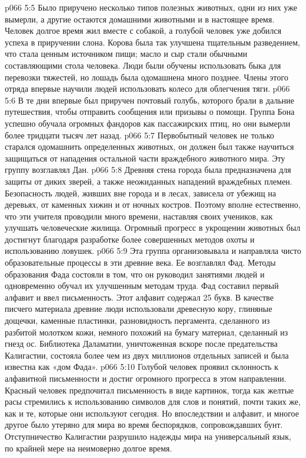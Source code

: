 \vs p066 5:5 Было приручено несколько типов полезных животных, одни из них уже вымерли, а другие остаются домашними животными и в настоящее время. Человек долгое время жил вместе с собакой, а голубой человек уже добился успеха в приручении слона. Корова была так улучшена тщательным разведением, что стала ценным источником пищи; масло и сыр стали обычными составляющими стола человека. Люди были обучены использовать быка для перевозки тяжестей, но лошадь была одомашнена много позднее. Члены этого отряда впервые научили людей использовать колесо для облегчения тяги.
\vs p066 5:6 В те дни впервые был приручен почтовый голубь, которого брали в дальние путешествия, чтобы отправить сообщения или призывы о помощи. Группа Бона успешно обучала огромных фандоров как пассажирских птиц, но они вымерли более тридцати тысяч лет назад.
\vs p066 5:7 \pc {}\bibnobreakspace {} Первобытный человек не только старался одомашнить определенных животных, он должен был также научиться защищаться от нападения остальной части враждебного животного мира. Эту группу возглавлял Дан.
\vs p066 5:8 Древняя стена города была предназначена для защиты от диких зверей, а также неожиданных нападений враждебных племен. Безопасность людей, живших вне города и в лесах, зависела от убежищ на деревьях, от каменных хижин и от ночных костров. Поэтому вполне естественно, что эти учителя проводили много времени, наставляя своих учеников, как улучшать человеческие жилища. Огромный прогресс в укрощении животных был достигнут благодаря разработке более совершенных методов охоты и использованию ловушек.
\vs p066 5:9 \pc {}\bibnobreakspace {} Эта группа организовывала и направляла чисто образовательные процессы в эти древние века. Ее возглавлял Фад. Методы образования Фада состояли в том, что он руководил занятиями людей и одновременно обучал их улучшенным методам труда. Фад составил первый алфавит и ввел письменность. Этот алфавит содержал 25 букв. В качестве писчего материала древние люди использовали древесную кору, глиняные дощечки, каменные пластинки, разновидность пергамента, сделанного из разбитой молотком кожи, немного похожий на бумагу материал, сделанный из гнезд ос. Библиотека Даламатии, уничтоженная вскоре после предательства Калигастии, состояла более чем из двух миллионов отдельных записей и была известна как «дом Фада».
\vs p066 5:10 Голубой человек проявил склонность к алфавитной письменности и достиг огромного прогресса в этом направлении. Красный человек предпочитал письменность в виде картинок, тогда как желтые расы стремились к использованию символов для слов и понятий, почти таких же, как и те, которые они используют сегодня. Но впоследствии и алфавит, и многое другое было утеряно для мира во время беспорядков, сопровождавших бунт. Отступничество Калигастии разрушило надежды мира на универсальный язык, по крайней мере на неимоверно долгое время.
